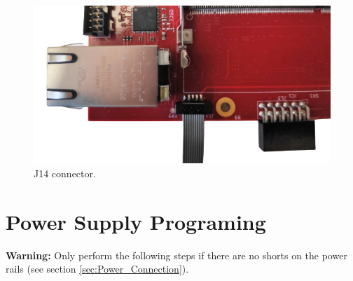 \documentclass[12pt,oneside,a4]{article}
\begin{document}
\begin{figure}[H]
\begin{center}
\includegraphics[width=0.8\linewidth]{mmcjtag.png}
 \caption{J14 connector. }\label{23}
\end{center}
\end{figure}


\section{Power Supply Programing}

\textbf{Warning:} Only perform the following steps if there are no shorts on the power rails (see section \ref{sec:Power_Connection}).
\end{document}
